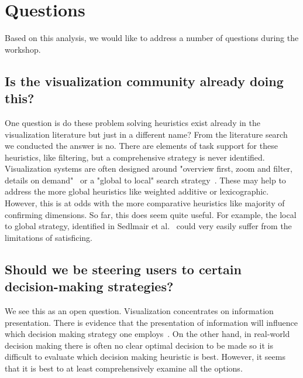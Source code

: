 \section{Questions}\label{questions}

Based on this analysis, we would like to address a number of questions during the workshop.

\subsection{Is the visualization community already doing this?}
\label{is-vis-already-doing-this}

One question is do these problem solving heuristics exist already in the
visualization literature but just in a different name? From the literature
search we conducted the answer is no. There are elements of task support for
these heuristics, like filtering, but a comprehensive strategy is never
identified. Visualization systems are often designed around 
"overview first, zoom and filter, details on demand"~\cite{Shneiderman:1996} or
a "global to local" search strategy~\cite{Sedlmair:2014}. These may help to
address the more global heuristics like weighted additive or lexicographic.
However, this is at odds with the more comparative heuristics like majority
of confirming dimensions. 
So far, this does seem quite useful. For example, the local to global
strategy, identified in Sedlmair et al.~\citep{Sedlmair:2014} could very
easily suffer from the limitations of satisficing.



\subsection{Should we be steering users to certain decision-making strategies?}

We see this as an open question. Visualization concentrates on information
presentation. There is evidence that the presentation of information will
influence which decision making strategy one employs~\citep{Jarvenpaa:1990}.
On the other hand, in real-world decision making there is often no clear
optimal decision to be made so it is difficult to evaluate which decision
making heuristic is best. However, it seems that it is best to at least
comprehensively examine all the options.

